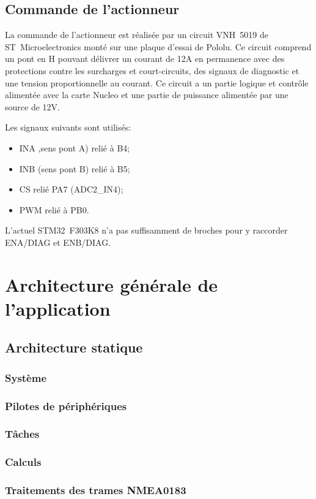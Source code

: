\documentclass[a4paper,11pt]{report}
\begin{document}
\section{Commande de l'actionneur}
La commande de l'actionneur est réalisée par un circuit VNH~5019 de ST~Microelectronics monté sur une plaque d'essai de Pololu.
Ce circuit comprend un pont en H pouvant délivrer un courant de 12A en permanence avec des protections contre les surcharges et court-circuits,
des signaux de diagnostic et une tension proportionnelle au courant.
Ce circuit a un partie logique et contrôle alimentée avec la carte Nucleo
et une partie de puissance alimentée par une source de 12V.

Les signaux suivants sont utilisés:
\begin{itemize}
	\item INA ,sens pont A) relié à B4;
	\item INB (sens pont B) relié à B5;
	\item CS relié PA7 (ADC2\_IN4);
	\item PWM relié à PB0.
\end{itemize}
L'actuel STM32~F303K8 n'a pas suffisamment de broches pour y raccorder ENA/DIAG et ENB/DIAG.

\chapter{Architecture générale de l'application}
\section{Architecture statique}
\subsection{Système}
\subsection{Pilotes de périphériques}
\subsection{Tâches}
\subsection{Calculs}
\subsection{Traitements des trames NMEA0183}
\end{document}
